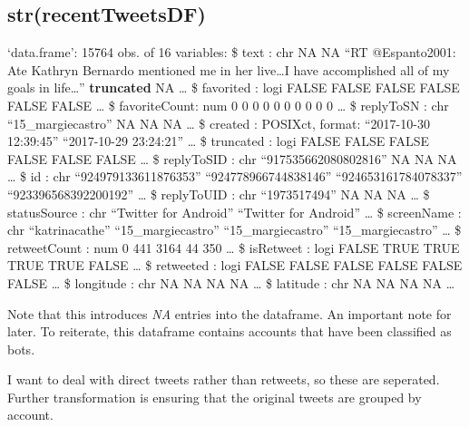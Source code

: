\documentclass[]{article}
\begin{document}
\hypertarget{strrecenttweetsdf}{%
\subsection{str(recentTweetsDF)}\label{strrecenttweetsdf}}

`data.frame': 15764 obs. of 16 variables: \$ text : chr NA NA ``RT
@Espanto2001: Ate Kathryn Bernardo mentioned me in her live\ldots{}I
have accomplished all of my goals in life\ldots{}''\textbar{}
\textbf{truncated} NA \ldots{} \$ favorited : logi FALSE FALSE FALSE
FALSE FALSE FALSE \ldots{} \$ favoriteCount: num 0 0 0 0 0 0 0 0 0 0
\ldots{} \$ replyToSN : chr ``15\_margiecastro'' NA NA NA \ldots{} \$
created : POSIXct, format: ``2017-10-30 12:39:45'' ``2017-10-29
23:24:21'' \ldots{} \$ truncated : logi FALSE FALSE FALSE FALSE FALSE
FALSE \ldots{} \$ replyToSID : chr ``917535662080802816'' NA NA NA
\ldots{} \$ id : chr ``924979133611876353'' ``924778966744838146''
``924653161784078337'' ``923396568392200192'' \ldots{} \$ replyToUID :
chr ``1973517494'' NA NA NA \ldots{} \$ statusSource : chr ``Twitter for
Android'' ``Twitter for Android'' \ldots{} \$ screenName : chr
``katrinacathe'' ``15\_margiecastro'' ``15\_margiecastro''
``15\_margiecastro'' \ldots{} \$ retweetCount : num 0 441 3164 44 350
\ldots{} \$ isRetweet : logi FALSE TRUE TRUE TRUE TRUE FALSE \ldots{} \$
retweeted : logi FALSE FALSE FALSE FALSE FALSE FALSE \ldots{} \$
longitude : chr NA NA NA NA \ldots{} \$ latitude : chr NA NA NA NA
\ldots{}

Note that this introduces \emph{NA} entries into the dataframe. An
important note for later. To reiterate, this dataframe contains accounts
that have been classified as bots.

I want to deal with direct tweets rather than retweets, so these are
seperated. Further transformation is ensuring that the original tweets
are grouped by account.
\end{document}
